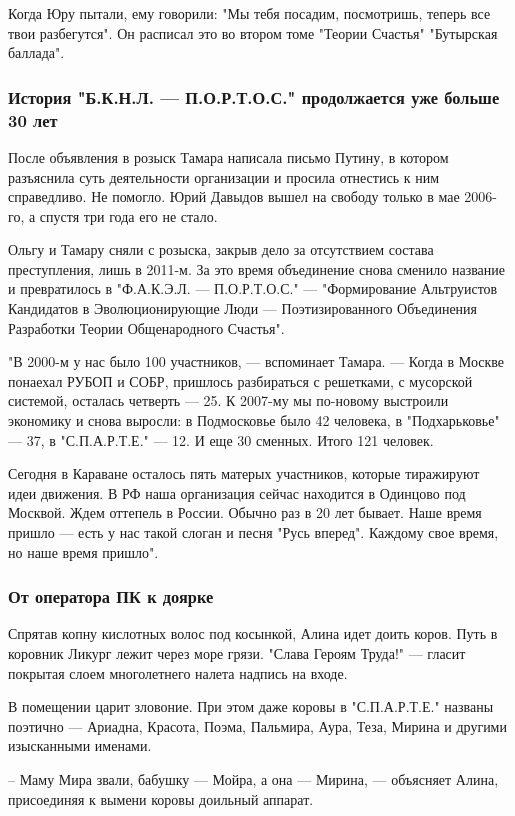 Когда Юру пытали, ему говорили: "Мы тебя посадим, посмотришь, теперь все твои
разбегутся". Он расписал это во втором томе "Теории Счастья" "Бутырская
баллада".

\subsubsection{История "Б.К.Н.Л. --- П.О.Р.Т.О.С." продолжается уже больше 30 лет}

После объявления в розыск Тамара написала письмо Путину, в котором разъяснила
суть деятельности организации и просила отнестись к ним справедливо. Не
помогло. Юрий Давыдов вышел на свободу только в мае 2006-го, а спустя три года
его не стало. 

Ольгу и Тамару сняли с розыска, закрыв дело за отсутствием состава
преступления, лишь в 2011-м. За это время объединение снова сменило название и
превратилось в "Ф.А.К.Э.Л. --- П.О.Р.Т.О.С." --- "Формирование Альтруистов
Кандидатов в Эволюционирующие Люди --- Поэтизированного Объединения Разработки
Теории Общенародного Счастья".

"В 2000-м у нас было 100 участников, --- вспоминает Тамара. --- Когда в Москве
понаехал РУБОП и СОБР, пришлось разбираться с решетками, с мусорской системой,
осталась четверть --- 25. К 2007-му мы по-новому выстроили экономику и снова
выросли: в Подмосковье было 42 человека, в "Подхарьковье" --- 37, в
"С.П.А.Р.Т.Е." --- 12. И еще 30 сменных. Итого 121 человек. 

Сегодня в Караване осталось пять матерых участников, которые тиражируют идеи
движения. В РФ наша организация сейчас находится в Одинцово под Москвой. Ждем
оттепель в России. Обычно раз в 20 лет бывает. Наше время пришло --- есть у нас
такой слоган и песня "Русь вперед". Каждому свое время, но наше время пришло".

\subsubsection{От оператора ПК к доярке}

Спрятав копну кислотных волос под косынкой, Алина идет доить коров. Путь в
коровник Ликург лежит через море грязи. "Слава Героям Труда!" --- гласит покрытая
слоем многолетнего налета надпись на входе.

В помещении царит зловоние. При этом даже коровы в "С.П.А.Р.Т.Е." названы
поэтично --- Ариадна, Красота, Поэма, Пальмира, Аура, Теза, Мирина и другими
изысканными именами.

– Маму Мира звали, бабушку --- Мойра, а она --- Мирина, --- объясняет Алина,
присоединяя к вымени коровы доильный аппарат.

